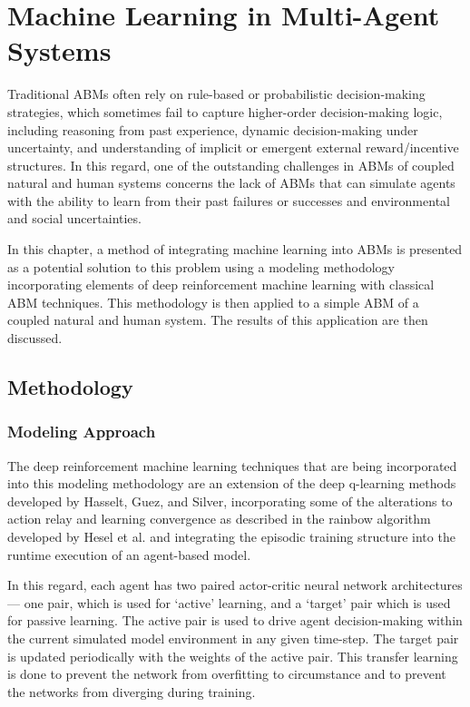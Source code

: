\chapter{Machine Learning in Multi-Agent Systems}
\label{chap:farm}

\newcommand{\flame}[0]{FLAMEGPU}
\newcommand{\norm}[0]{\mathcal{N}}
\newcommand{\argmax}[2]{\text{argmax}_{#1}\left(#2\right)}

Traditional ABMs often rely on rule-based or probabilistic decision-making strategies, which sometimes fail to capture higher-order decision-making logic, including reasoning from past experience, dynamic decision-making under uncertainty, and understanding of implicit or emergent external reward/incentive structures.
In this regard, one of the outstanding challenges in ABMs of coupled 
natural and human systems concerns the lack of ABMs that can simulate agents
with the ability to learn from their past failures or successes 
and environmental and social uncertainties.~\cite{sert2020segregation}

In this chapter, a method of integrating machine learning into ABMs is
presented as a potential solution to this problem using
a modeling methodology incorporating elements of deep reinforcement machine
learning with classical ABM techniques.
This methodology is then applied to a simple ABM of a coupled natural and human
system.
The results of this application are then discussed.

\section{Methodology}
\label{sec:farm_methods}

\subsection{Modeling Approach}
\label{subsec:farm_methods_aroach}

The deep reinforcement machine learning techniques that are being incorporated
into this modeling methodology are an extension of the deep q-learning methods 
developed by Hasselt, Guez, and Silver\cite{ddqn16}, 
incorporating some of the alterations to action relay
and learning convergence as described in the rainbow algorithm developed by
Hesel et al.\cite{rainbow18} and integrating the episodic training structure
into the runtime execution of an agent-based model.

In this regard, each agent has two paired actor-critic neural network
architectures --- one pair, which is used for `active' learning,
and a `target' pair which is used for passive learning.
The active pair is used to drive agent decision-making within the
current simulated model environment in any given time-step.
The target pair is updated periodically with the weights of the active
pair.
This transfer learning is done to prevent the network from overfitting 
to circumstance and to prevent the networks from diverging during training.

